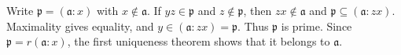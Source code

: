 Write $\mathfrak{p}=(\mathfrak{a}:x)$ with $x\notin\mathfrak{a}$. If $yz\in\mathfrak{p}$ and $z\notin\mathfrak{p}$, then $zx\notin\mathfrak{a}$ and $\mathfrak{p}\subseteq(\mathfrak{a}:zx)$. Maximality gives equality, and $y\in(\mathfrak{a}:zx)=\mathfrak{p}$. Thus $\mathfrak{p}$ is prime. Since $\mathfrak{p}=r(\mathfrak{a}:x)$, the first uniqueness theorem shows that it belongs to $\mathfrak{a}$.
